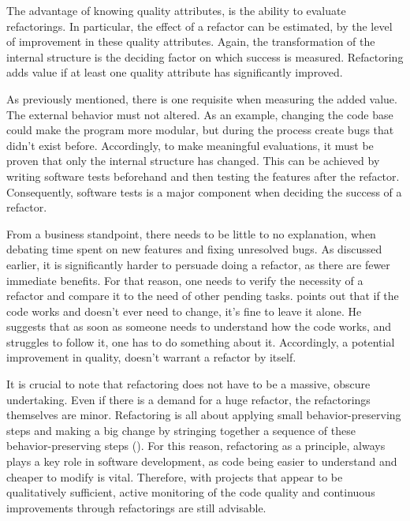 The advantage of knowing quality attributes, is the ability to evaluate refactorings. 
In particular, the effect of a refactor can be estimated, 
	by the level of improvement in these quality attributes.
Again, the transformation of the internal structure 
	is the deciding factor on which success is measured.
Refactoring adds value if at least one quality attribute has significantly improved.

As previously mentioned, there is one requisite when measuring the added value.
The external behavior must not altered. 
As an example, changing the code base could make the program more modular, 
	but during the process create bugs that didn't exist before. 
Accordingly, to make meaningful evaluations, 
	it must be proven that only the internal structure has changed.
This can be achieved by writing software tests beforehand 
	and then testing the features after the refactor.
Consequently, software tests is a major component when deciding the success of a refactor.




From a business standpoint, there needs to be little to no explanation, 
	when debating time spent on new features and fixing unresolved bugs.
As discussed earlier, it is significantly harder to persuade doing a refactor, 
	as there are fewer immediate benefits.
For that reason, one needs to verify the necessity of a refactor 
	and compare it to the need of other pending tasks.
\textcite[p.~5]{fowler2018} points out that if the code works and doesn't ever need to change, 
	it's fine to leave it alone.
He suggests that as soon as someone needs to understand how the code works, 
	and struggles to follow it, one has to do something about it.
Accordingly, a potential improvement in quality, doesn't warrant a refactor by itself.

It is crucial to note that refactoring does not have to be a massive, obscure undertaking.
Even if there is a demand for a huge refactor, the refactorings themselves are minor.
Refactoring is all about applying small behavior-preserving steps 
	and making a big change by stringing together a sequence of these behavior-preserving steps (\cite[p.~45]{fowler2018}). 
For this reason, refactoring as a principle, 
	always plays a key role in software development, 
	as code being easier to understand and cheaper to modify is vital.
Therefore, with projects that appear to be qualitatively sufficient, 
	active monitoring of the code quality and continuous improvements 
	through refactorings are still advisable.

